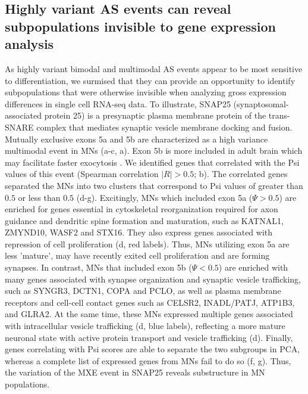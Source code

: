 \subsection{Highly variant AS events can reveal subpopulations invisible to gene expression analysis}

As highly variant bimodal and multimodal AS events appear to be most sensitive to differentiation, we surmised that they can provide an opportunity to identify subpopulations that were otherwise invisible when analyzing gross expression differences in single cell RNA-seq data. To illustrate, SNAP25 (synaptosomal-associated protein 25) is a presynaptic plasma membrane protein of the trans-SNARE complex that mediates synaptic vesicle membrane docking and fusion. Mutually exclusive exons 5a and 5b are characterized as a high variance multimodal event in MNs (a-c, a). Exon 5b is more included in adult brain \cite{Johansson:2008kx} which may facilitate faster exocytosis \cite{Nagy2008-paperpile}. We identified genes that correlated with the Psi values of this event (Spearman correlation $|R| > 0.5$; b). The correlated genes separated the MNs into two clusters that correspond to Psi values of greater than $0.5$ or less than $0.5$ (d-g). Excitingly, MNs which included exon 5a ($\Psi > 0.5$) are enriched for genes essential in cytoskeletal reorganization required for axon guidance and dendritic spine formation and maturation, such as KATNAL1, ZMYND10, WASF2 and STX16. They also express genes associated with repression of cell proliferation (d, red labels). Thus, MNs utilizing exon 5a are less 'mature', may have recently exited cell proliferation and are forming synapses. In contrast, MNs that included exon 5b ($\Psi < 0.5$) are enriched with many genes associated with synapse organization and synaptic vesicle trafficking, such as SYNGR3, DCTN1, COPA and PCLO, as well as plasma membrane receptors and cell-cell contact genes such as CELSR2, INADL/PATJ, ATP1B3, and GLRA2. At the same time, these MNs expressed multiple genes associated with intracellular vesicle trafficking (d, blue labels), reflecting a more mature neuronal state with active protein transport and vesicle trafficking (d). Finally, genes correlating with Psi scores are able to separate the two subgroups in PCA, whereas a complete list of expressed genes from MNs fail to do so (f, g). Thus, the variation of the MXE event in SNAP25 reveals substructure in MN populations.


